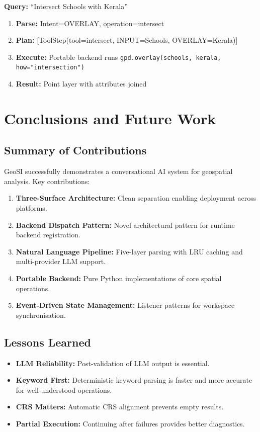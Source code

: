\documentclass[12pt,a4paper]{report}
\begin{document}
\textbf{Query:} ``Intersect Schools with Kerala''

\begin{enumerate}
  \item \textbf{Parse:} Intent=OVERLAY, operation=intersect
  \item \textbf{Plan:} [ToolStep(tool=intersect, INPUT=Schools, OVERLAY=Kerala)]
  \item \textbf{Execute:} Portable backend runs \texttt{gpd.overlay(schools, kerala, how="intersection")}
  \item \textbf{Result:} Point layer with attributes joined
\end{enumerate}

\chapter{Conclusions and Future Work}

\section{Summary of Contributions}

GeoSI successfully demonstrates a conversational AI system for geospatial analysis. Key contributions:

\begin{enumerate}
  \item \textbf{Three-Surface Architecture:} Clean separation enabling deployment across platforms.
  \item \textbf{Backend Dispatch Pattern:} Novel architectural pattern for runtime backend registration.
  \item \textbf{Natural Language Pipeline:} Five-layer parsing with LRU caching and multi-provider LLM support.
  \item \textbf{Portable Backend:} Pure Python implementations of core spatial operations.
  \item \textbf{Event-Driven State Management:} Listener patterns for workspace synchronisation.
\end{enumerate}

\section{Lessons Learned}

\begin{itemize}
  \item \textbf{LLM Reliability:} Post-validation of LLM output is essential.
  \item \textbf{Keyword First:} Deterministic keyword parsing is faster and more accurate for well-understood operations.
  \item \textbf{CRS Matters:} Automatic CRS alignment prevents empty results.
  \item \textbf{Partial Execution:} Continuing after failures provides better diagnostics.
\end{itemize}
\end{document}
